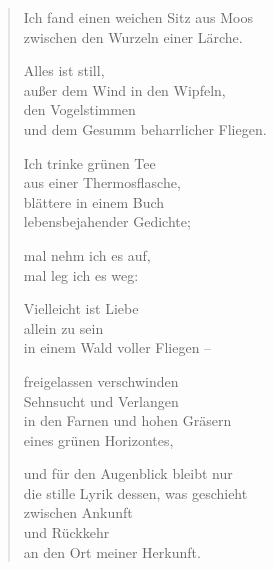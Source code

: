 
\cleartoverso


\begin{verse}
Ich fand einen weichen Sitz aus Moos\\
zwischen den Wurzeln einer Lärche.

Alles ist still,\\
außer dem Wind in den Wipfeln,\\
den Vogelstimmen\\
und dem Gesumm beharrlicher Fliegen.

Ich trinke grünen Tee\\
aus einer Thermosflasche,\\
blättere in einem Buch\\
lebensbejahender Gedichte;

mal nehm ich es auf,\\
mal leg ich es weg:

Vielleicht ist Liebe\\
allein zu sein\\
in einem Wald voller Fliegen --

freigelassen verschwinden\\
Sehnsucht und Verlangen\\
in den Farnen und hohen Gräsern\\
eines grünen Horizontes,

und für den Augenblick bleibt nur\\
die stille Lyrik dessen, was geschieht\\
zwischen Ankunft\\
und Rückkehr\\
an den Ort meiner Herkunft.
\end{verse}

\cleartoverso


